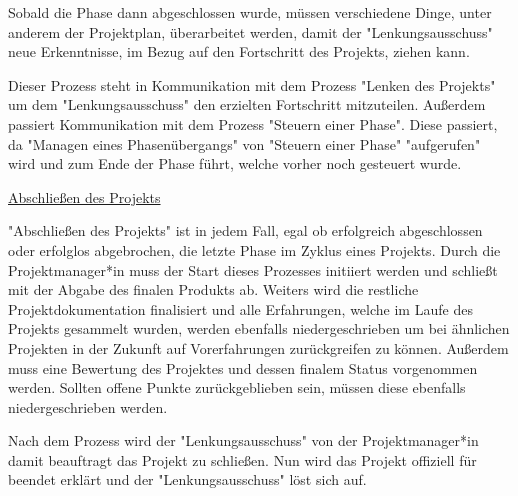 Sobald die Phase dann abgeschlossen wurde, müssen verschiedene Dinge, unter anderem der Projektplan, überarbeitet werden, damit der "Lenkungsausschuss" neue Erkenntnisse, im Bezug auf den Fortschritt des Projekts, ziehen kann. \cite{Prince2}

Dieser Prozess steht in Kommunikation mit dem Prozess "Lenken des Projekts" um dem "Lenkungsausschuss" den erzielten Fortschritt mitzuteilen. Außerdem passiert Kommunikation mit dem Prozess "Steuern einer Phase". Diese passiert, da "Managen eines Phasenübergangs" von "Steuern einer Phase" "aufgerufen" wird und zum Ende der Phase führt, welche vorher noch gesteuert wurde. \cite{Prince2}

\underline{Abschließen des Projekts}

"Abschließen des Projekts" ist in jedem Fall, egal ob erfolgreich abgeschlossen oder erfolglos abgebrochen, die letzte Phase im Zyklus eines Projekts. Durch die Projektmanager*in muss der Start dieses Prozesses initiiert werden und schließt mit der Abgabe des finalen Produkts ab. Weiters wird die restliche Projektdokumentation finalisiert und alle Erfahrungen, welche im Laufe des Projekts gesammelt wurden, werden ebenfalls niedergeschrieben um bei ähnlichen Projekten in der Zukunft auf Vorerfahrungen zurückgreifen zu können. Außerdem muss eine Bewertung des Projektes und dessen finalem Status vorgenommen werden. Sollten offene Punkte zurückgeblieben sein, müssen diese ebenfalls niedergeschrieben werden. \cite{Prince2}

Nach dem Prozess wird der "Lenkungsausschuss" von der Projektmanager*in damit beauftragt das Projekt zu schließen. Nun wird das Projekt offiziell für beendet erklärt und der "Lenkungsausschuss" löst sich auf. \cite{Prince2}

